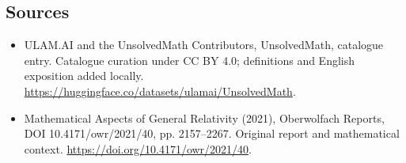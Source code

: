 \documentclass[11pt]{article}
\begin{document}
\subsection{Sources}
\begin{itemize}
\item[\hypertarget{source:statement:1}{S1}] ULAM.AI and the UnsolvedMath Contributors, UnsolvedMath, catalogue entry. Catalogue curation under CC BY 4.0; definitions and English exposition added locally.
\url{https://huggingface.co/datasets/ulamai/UnsolvedMath}.
\item[\hypertarget{source:statement:2}{S2}] Mathematical Aspects of General Relativity (2021), Oberwolfach Reports, DOI 10.4171/owr/2021/40, pp. 2157--2267. Original report and mathematical context.
\url{https://doi.org/10.4171/owr/2021/40}.
\end{itemize}
\label{end:statement}
\end{document}
